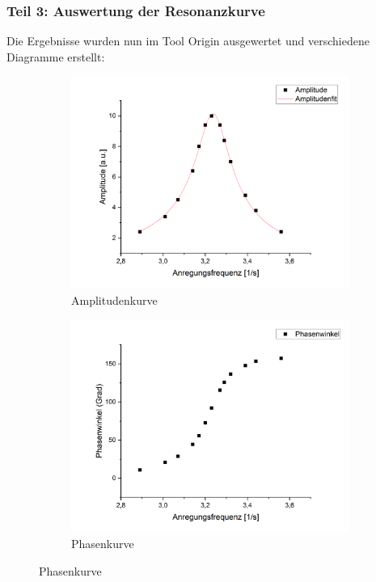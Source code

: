         \subsubsection{Teil 3: Auswertung der Resonanzkurve}

            Die Ergebnisse wurden nun im Tool Origin ausgewertet und verschiedene Diagramme erstellt:

            \begin{figure}[H]
                \begin{subfigure}{0.48\textwidth}
                    \centering
                    \includegraphics[width=\textwidth]{bilder/AmplitudenkurveGruppe2.png}
                    \caption{Amplitudenkurve}
                    \label{fig:Amplitudenkurve}
                \end{subfigure}
                \begin{subfigure}{0.48\textwidth}
                    \centering
                    \includegraphics[width=\textwidth]{bilder/PhasenwinkelGruppe2.png}
                    \caption{Phasenkurve}
                    \label{fig:Phasenkurve}
                \end{subfigure}
            \end{figure}

